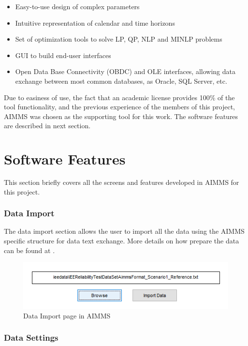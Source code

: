 \documentclass[12pt,LUDisStyle,twosided]{book}
\begin{document}
\begin{itemize}
\item Easy-to-use design of complex parameters
\item Intuitive representation of calendar and time horizons
\item Set of optimization tools to solve LP, QP, NLP and MINLP problems
\item GUI to build end-user interfaces
\item Open Data Base Connectivity (OBDC) and OLE interfaces, allowing data exchange between most common databases, as Oracle, SQL Server, etc.
\end{itemize}

Due to easiness of use, the fact that an academic license provides 100\% of the tool functionality, and the previous experience of the members of this project, AIMMS was chosen as the supporting tool for this work. The software features are described in next section.

\section{Software Features}

This section briefly covers all the screens and features developed in AIMMS for this project.

\subsubsection{Data Import}

The data import section allows the user to import all the data using the AIMMS specific structure for data text exchange. More details on how prepare the data can be found at \cite{bisschop}.

\begin{figure}[h] 
	\begin{center}
		\includegraphics[keepaspectratio]{aimmsScreenImportPage.png}
	  	\caption{Data Import page in AIMMS}
     	\label{fig:aimmsScreenImportPage}
	\end{center}
\end{figure}

\subsubsection{Data Settings}
\end{document}
